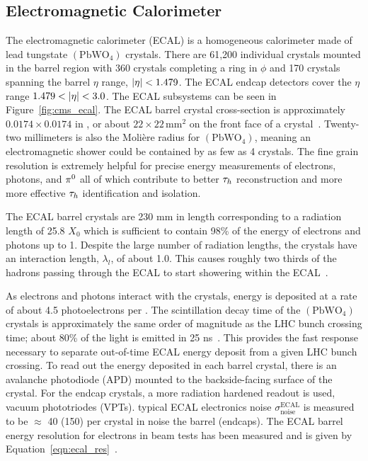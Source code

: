 \subsection{Electromagnetic Calorimeter}
The electromagnetic calorimeter (ECAL) is a homogeneous calorimeter made of lead 
tungstate $(\textrm{PbWO}_{4})$ crystals. There are 61,200 individual crystals mounted
in the barrel region with 360 crystals completing a ring in $\phi$ and 170 crystals
spanning the barrel $\eta$ range, $\lvert\eta\rvert < 1.479$. 
The ECAL endcap detectors cover the $\eta$ range $1.479 < \lvert\eta\rvert < 3.0$. The
ECAL subsystems can be seen in Figure~\ref{fig:cms_ecal}.
The ECAL barrel crystal cross-section is approximately $0.0174 \times 0.0174$ 
in \etaphi, or about $22 \times 22 \, \textrm{mm}^{2}$
on the front face of a crystal~\cite{Chatrchyan:2008zzk}. Twenty-two millimeters is also the Moli\`ere radius
for $(\textrm{PbWO}_{4})$, meaning an electromagnetic shower could be
contained by as few as 4 crystals. The fine grain resolution is extremely
helpful for precise energy measurements of electrons, photons, and $\pi^{0}$ all of which
contribute to better $\tau_{h}$ reconstruction and more more effective
$\tau_{h}$ identification and isolation.

The ECAL barrel crystals are 230 mm in length corresponding to a
radiation length of 25.8 $X_{0}$ which is sufficient to contain 98\% of the energy
of electrons and photons up to 1\TeV. Despite the large number of radiation lengths,
the crystals have an interaction length, $\lambda_{l}$, of about 1.0. This causes
roughly two thirds of the hadrons passing through the ECAL to start showering
within the ECAL~\cite{Chatrchyan:2008zzk}. 

As electrons and photons interact with the crystals, energy is deposited at a rate of about 4.5
photoelectrons per \MeV.
The scintillation decay time of the $(\textrm{PbWO}_{4})$ crystals is approximately the
same order of magnitude as the LHC bunch crossing time; about 80\% of the light is 
emitted in 25 ns~\cite{dafinei_auffray_lecoq_schneegans_1994}.
This provides the fast response necessary to separate out-of-time ECAL energy deposit
from a given LHC bunch crossing. To read out the energy deposited in each barrel
crystal, there is an avalanche photodiode (APD) mounted to the backside-facing surface
of the crystal. For the endcap crystals, a more radiation hardened readout is used,
vacuum phototriodes (VPTs). typical ECAL electronics noise 
$\sigma ^{\text{ECAL}} _{\text{noise}}$ is measured to be $\approx$ 40 (150)\MeV 
per crystal in noise the barrel (endcaps).
The ECAL barrel energy resolution for electrons in beam tests has been measured 
and is given by Equation~\ref{eqn:ecal_res}~\cite{Adzic:2007mi}.

